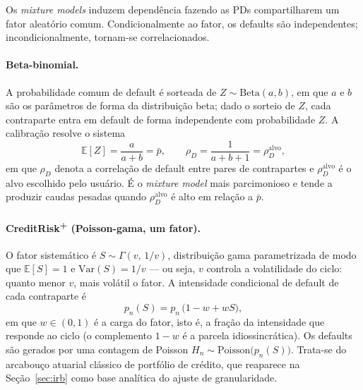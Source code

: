 \documentclass[11pt,a4paper]{article}
\newcommand{\E}{\mathbb{E}}
\begin{document}
Os \emph{mixture models} induzem dependência fazendo as PDs compartilharem um fator aleatório comum. Condicionalmente ao fator, os defaults são independentes; incondicionalmente, tornam-se correlacionados.

\paragraph{Beta-binomial.} A probabilidade comum de default é sorteada de $Z\sim\mathrm{Beta}(a,b)$, em que $a$ e $b$ são os parâmetros de forma da distribuição beta; dado o sorteio de $Z$, cada contraparte entra em default de forma independente com probabilidade $Z$. A calibração resolve o sistema
\begin{equation}
\E[Z]=\frac{a}{a+b}=\bar p,
\qquad
\rho_D=\frac{1}{a+b+1}=\rho_D^{\mathrm{alvo}},
\end{equation}
em que $\rho_D$ denota a correlação de default entre pares de contrapartes e $\rho_D^{\mathrm{alvo}}$ é o alvo escolhido pelo usuário. É o \emph{mixture model} mais parcimonioso e tende a produzir caudas pesadas quando $\rho_D^{\mathrm{alvo}}$ é alto em relação a $\bar p$.

\paragraph{CreditRisk\textsuperscript{+} (Poisson-gama, um fator).} O fator sistemático é $S\sim\Gamma(v,\,1/v)$, distribuição gama parametrizada de modo que $\E[S]=1$ e $\mathrm{Var}(S)=1/v$ --- ou seja, $v$ controla a volatilidade do ciclo: quanto menor $v$, mais volátil o fator. A intensidade condicional de default de cada contraparte é
\begin{equation}
p_n(S) = p_n\,\bigl(1-w+wS\bigr),
\end{equation}
em que $w\in(0,1)$ é a carga do fator, isto é, a fração da intensidade que responde ao ciclo (o complemento $1-w$ é a parcela idiossincrática). Os defaults são gerados por uma contagem de Poisson $H_n\sim\mathrm{Poisson}\bigl(p_n(S)\bigr)$. Trata-se do arcabouço atuarial clássico de portfólio de crédito, que reaparece na Seção~\ref{sec:irb} como base analítica do ajuste de granularidade.
\end{document}
